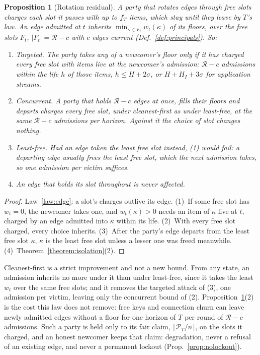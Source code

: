 \documentclass[journal]{IEEEtran}
\newtheorem{proposition}{Proposition}
\newcommand{\Rg}{\mathcal{R}}
\newcommand{\Pool}{\mathcal{P}}
\begin{document}
\begin{proposition}[Rotation residual]\label{prop:rotation}
A party that rotates edges through free slots charges each slot it passes with up to $f_T$
items, which stay until they leave by $T$'s law.  An edge admitted at $t$ inherits
$\min_{\kappa\in F_t}w_t(\kappa)$ of its floors, over the free slots $F_t$, $|F_t|=\Rg-c$ with
$c$ edges current (Def.~\ref{def:principals}).  So:
\begin{enumerate}[leftmargin=1.5em]
\item \emph{Targeted.}  The party takes any of a newcomer's floor only if it has charged every
free slot with items live at the newcomer's admission: $\Rg-c$ admissions within the life $h$ of
those items, $h\le H+2\sigma$, or $H+H_I+3\sigma$ for application streams.
\item \emph{Concurrent.}  A party that holds $\Rg-c$ edges at once, fills their floors and
departs charges every free slot, under cleanest-first as under least-free, at the same $\Rg-c$
admissions per horizon.  Against it the choice of slot changes nothing.
\item \emph{Least-free.}  Had an edge taken the least free slot instead, (1) would fail: a
departing edge usually frees the least free slot, which the next admission takes, so one
admission per victim suffices.
\item An edge that holds its slot throughout is never affected.
\end{enumerate}
\end{proposition}
\begin{proof}
Law~\ref{law:edge}: a slot's charges outlive its edge.  (1)~If some free slot has $w_t=0$, the
newcomer takes one, and $w_t(\kappa)>0$ needs an item of $\kappa$ live at $t$, charged by an
edge admitted into $\kappa$ within its life.  (2)~With every free slot charged, every choice
inherits.  (3)~After the party's edge departs from the least free slot $\kappa$, $\kappa$ is the
least free slot unless a lesser one was freed meanwhile.  (4)~Theorem~\ref{theorem:isolation}(2).
\end{proof}

Cleanest-first is a strict improvement and not a new bound.  From any state, an admission
inherits no more under it than under least-free, since it takes the least $w_t$ over the same
free slots; and it removes the targeted attack of (3), one admission per victim, leaving only the
concurrent bound of (2).  Proposition~\ref{prop:rotation}(2) is the cost this law does not
remove: free keys and connection churn can leave newly admitted edges without a floor for one
horizon of $T$ per round of $\Rg-c$ admissions.  Such a party is
held only to its fair claim, $\lceil\Pool_T/n\rceil$, on the slots it charged, and an honest
newcomer keeps that claim: degradation, never a refusal of an existing edge, and never a
permanent lockout (Prop.~\ref{prop:nolockout}).
\end{document}

